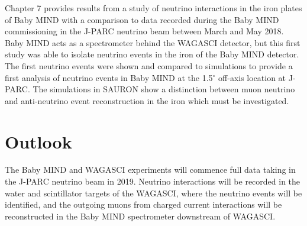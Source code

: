 Chapter 7 provides results from a study of neutrino interactions in the iron plates of Baby MIND with a comparison to data recorded during the Baby MIND commissioning in the J-PARC neutrino beam between March and May 2018. Baby MIND acts as a spectrometer behind the WAGASCI detector, but this first study was able to isolate neutrino events in the iron of the Baby MIND detector. The first neutrino events were shown and compared to simulations to provide a first analysis of neutrino events in Baby MIND at the 1.5$^\circ$ off-axis location at J-PARC. The simulations in SAURON show a distinction between muon neutrino and anti-neutrino event reconstruction in the iron which must be investigated.



\section{Outlook}


The Baby MIND and WAGASCI experiments will commence full data taking in the J-PARC neutrino beam in 2019. Neutrino interactions will be recorded in the water and scintillator targets of the WAGASCI, where the neutrino events will be identified, and the outgoing muons from charged current interactions will be reconstructed in the Baby MIND spectrometer downstream of WAGASCI.



